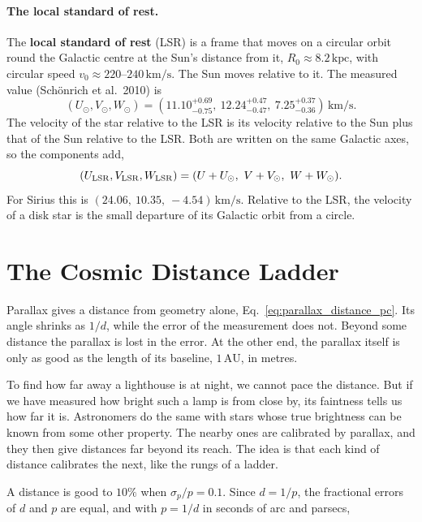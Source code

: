 \paragraph{The local standard of rest.} The \textbf{local standard of rest} (LSR) is a frame that moves on a circular orbit round the Galactic centre at the Sun's distance from it, $R_0\approx8.2\,\mathrm{kpc}$, with circular speed $v_0\approx220$--$240\,\mathrm{km/s}$. The Sun moves relative to it. The measured value (Sch\"onrich et al.\ 2010) is
\begin{equation}
	(U_\odot, V_\odot, W_\odot) = (11.10^{+0.69}_{-0.75},\ 12.24^{+0.47}_{-0.47},\ 7.25^{+0.37}_{-0.36})\,\mathrm{km/s}.
\end{equation}
The velocity of the star relative to the LSR is its velocity relative to the Sun plus that of the Sun relative to the LSR. Both are written on the same Galactic axes, so the components add,
\begin{equation}
	(U_{\rm LSR}, V_{\rm LSR}, W_{\rm LSR}) = (U + U_\odot,\ V + V_\odot,\ W + W_\odot).
\end{equation}
For Sirius this is $(24.06,\ 10.35,\ -4.54)\,\mathrm{km/s}$. Relative to the LSR, the velocity of a disk star is the small departure of its Galactic orbit from a circle.

\section{The Cosmic Distance Ladder}
\label{as:sec:ladder}

Parallax gives a distance from geometry alone, Eq.~\eqref{eq:parallax_distance_pc}. Its angle shrinks as $1/d$, while the error of the measurement does not. Beyond some distance the parallax is lost in the error. At the other end, the parallax itself is only as good as the length of its baseline, $1\,\mathrm{AU}$, in metres.

To find how far away a lighthouse is at night, we cannot pace the distance. But if we have measured how bright such a lamp is from close by, its faintness tells us how far it is. Astronomers do the same with stars whose true brightness can be known from some other property. The nearby ones are calibrated by parallax, and they then give distances far beyond its reach. The idea is that each kind of distance calibrates the next, like the rungs of a ladder.

A distance is good to $10\%$ when $\sigma_p/p=0.1$. Since $d=1/p$, the fractional errors of $d$ and $p$ are equal, and with $p=1/d$ in seconds of arc and parsecs,

